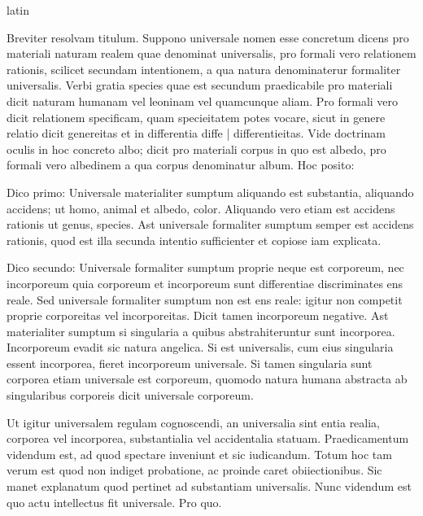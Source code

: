 \begin{otherlanguage*}{latin}
\pstart
{}
\pend

\pstart
Breviter resolvam titulum. Suppono universale nomen esse concretum dicens pro materiali naturam realem quae denominat universalis, pro formali vero relationem rationis, scilicet secundam intentionem, a qua natura denominaterur formaliter universalis. Verbi gratia species quae est secundum praedicabile pro materiali dicit naturam humanam vel leoninam vel quamcunque aliam. Pro formali vero dicit relationem specificam, quam specieitatem potes vocare, sicut in genere relatio dicit genereitas et in differentia diffe \textnormal{|} differentieitas. Vide doctrinam oculis in hoc concreto albo; dicit pro materiali corpus in quo est albedo, pro formali vero albedinem a qua corpus denominatur album. Hoc posito:
\pend

\pstart
Dico primo:
Universale materialiter sumptum aliquando est substantia, aliquando accidens; ut homo, animal et albedo, color. Aliquando vero etiam est accidens rationis ut genus, species. Ast universale formaliter sumptum semper est accidens rationis, quod est illa secunda intentio sufficienter et copiose iam explicata. 
\pend

\pstart
Dico secundo:
Universale formaliter sumptum proprie neque est corporeum, nec incorporeum quia corporeum et incorporeum sunt differentiae discriminates ens reale. Sed universale formaliter sumptum non est ens reale:
igitur non competit proprie corporeitas vel incorporeitas. Dicit tamen incorporeum negative. Ast materialiter sumptum si singularia a quibus abstrahiteruntur sunt incorporea. Incorporeum evadit sic natura angelica. Si est universalis, cum eius singularia essent incorporea, fieret incorporeum universale. Si tamen singularia sunt corporea etiam universale est corporeum, quomodo natura humana abstracta ab singularibus corporeis dicit universale corporeum. 
\pend

\pstart
Ut igitur universalem regulam cognoscendi, an universalia sint entia realia, corporea vel incorporea, substantialia vel accidentalia statuam. Praedicamentum videndum est, ad quod spectare inveniunt et sic iudicandum. Totum hoc tam verum est quod non indiget probatione, ac proinde caret obiiectionibus. Sic manet explanatum quod pertinet ad substantiam universalis. Nunc videndum est quo actu intellectus fit universale. Pro quo. 
\pend


\end{otherlanguage*}
